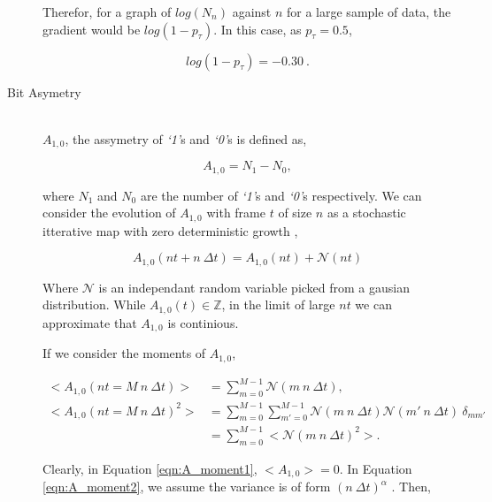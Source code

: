 \begin{description}
					Therefor, for a graph of $log(N_n)$ against $n$ for a large sample of data, the gradient would be $log(1 - p_\tau)$.
					In this case, as $p_\tau = 0.5$, 

					\begin{equation}
						log(1 - p_\tau) = -0.30\ .
						\label{eqn:log_chain_length_gradient}			
					\end{equation}

				\item[Bit Asymetry] \hfill \\
					
					$A_{1,0}$, the assymetry of \textit{`1'}s and \textit{`0'}s is defined as,

					\begin{equation}
						A_{1,0} = N_1 - N_0,
						\label{eqn:a_def}
					\end{equation}

					where $N_1$ and $N_0$ are the number of \textit{`1'}s and \textit{`0'}s respectively.
					We can consider the evolution of $A_{1,0}$ with frame $t$ of size $n$ as a stochastic itterative map with zero deterministic growth \cite{ref:stockastic_physics},

					\begin{equation}
						A_{1,0}(nt + n\ \Delta t) = A_{1,0}(nt) + \mathcal{N}(nt)
					\end{equation}

					Where $\mathcal{N}$ is an independant random variable picked from a gausian distribution. While $A_{1,0}(t) \in \mathbb{Z}$, in the limit of large $nt$ we can approximate that $A_{1,0}$ is continious. 
					\par
					If we consider the moments of $A_{1,0}$,

					\begin{align}
						\label{eqn:A_moment1}
						<A_{1,0}(nt = M\ n\ \Delta t)> & = \sum_{m = 0}^{M -1}  \mathcal{N}(m\ n\ \Delta t), \\
						\label{eqn:A_moment2}
						<A_{1,0}(nt = M\ n\ \Delta t)^2> & = \sum_{m=0}^{M-1} \sum_{m'=0}^{M-1}  \mathcal{N}(m\ n\ \Delta t) \mathcal{N}(m'\ n\ \Delta t)\ \delta_{mm'} \nonumber \\
						&= \sum_{m=0}^{M-1} < \mathcal{N}(m\ n\ \Delta t)^2 >.
					\end{align}

					Clearly, in Equation \ref{eqn:A_moment1}, $<A_{1,0}> = 0$. In Equation \ref{eqn:A_moment2}, we assume the variance is of form $(n\ \Delta t)^\alpha$ \cite{ref:stockastic_physics}. Then,


\end{description}
